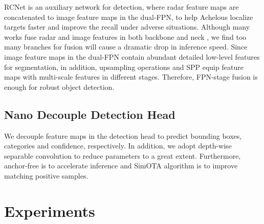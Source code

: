 \documentclass[letterpaper, 10 pt, conference]{ieeeconf}
\begin{document}
RCNet is an auxiliary network for detection, where radar feature maps are concatenated to image feature maps in the dual-FPN, to help Achelous localize targets faster and improve the recall under adverse situations. Although many works fuse radar and image features in both backbone and neck \cite{cheng2021robust}\cite{song2022ms}, we find too many branches for fusion will cause a dramatic drop in inference speed. Since image feature maps in the dual-FPN contain abundant detailed low-level features for segmentation, in addition, upsampling operations and SPP equip feature maps with multi-scale features in different stages. Therefore, FPN-stage fusion is enough for robust object detection.



\subsection{Nano Decouple Detection Head}
We decouple feature maps in the detection head to predict bounding boxes, categories and confidence, respectively. In addition, we adopt depth-wise separable convolution to reduce parameters to a great extent. Furthermore, anchor-free is to accelerate inference and SimOTA \cite{ge2021yolox} algorithm is to improve matching positive samples.




\section{Experiments}
\end{document}
